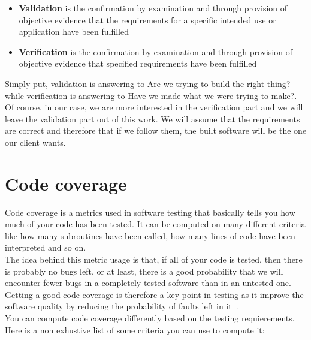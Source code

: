 \documentclass[12pt]{article}
\theoremstyle{definition}
\theoremstyle{definition}
\theoremstyle{remark}
\begin{document}
\begin{itemize}

\item \textbf{Validation} is the confirmation by examination and through provision of objective evidence that the requirements for a specific intended use or application have been fulfilled~\cite{IEEEStd1990}
\item \textbf{Verification} is the confirmation by examination and through provision of objective evidence that specified requirements have been fulfilled~\cite{IEEEStd1990}

\end{itemize}

Simply put, validation is answering to \guillemotleft Are we trying to build the right thing?\guillemotright while verification is answering to \guillemotleft Have we made what we were trying to make?\guillemotright. Of course, in our case, we are more interested in the verification part and we will leave the validation part out of this work. We will assume that the requirements are correct and therefore that if we follow them, the built software will be the one our client wants.



\section{Code coverage}


Code coverage is a metrics used in software testing that basically tells you how much of your code has been tested. It can be computed on many different criteria like how many subroutines have been called, how many lines of code have been interpreted and so on.\\

The idea behind this metric usage is that, if all of your code is tested, then there is probably no bugs left, or at least, there is a good probability that we will encounter fewer bugs in a completely tested software than in an untested one. Getting a good code coverage is therefore a key point in testing as it improve the software quality by reducing the probability of faults left in it~\cite{TestingForContinuousDelivery:2016}.\\

You can compute code coverage differently based on the testing requierements. Here is a non exhustive list of some criteria you can use to compute it:
\end{document}
